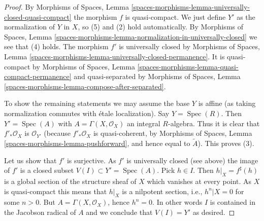\documentclass[10pt,a4paper]{amsart}
\theoremstyle{plain}
\theoremstyle{definition}
\theoremstyle{remark}
\numberwithin{equation}{subsection}
\def\Spec{\mathop{\mathrm{Spec}}}
\begin{document}
\begin{proof}
By Morphisms of Spaces, Lemma
\ref{spaces-morphisms-lemma-universally-closed-quasi-compact}
the morphism $f$ is quasi-compact.
We just define $Y'$ as the normalization of $Y$ in $X$, so (5) and (2) hold
automatically. By
Morphisms of Spaces, Lemma
\ref{spaces-morphisms-lemma-normalization-in-universally-closed}
we see that (4) holds. The morphism $f'$ is universally closed by
Morphisms of Spaces, Lemma
\ref{spaces-morphisms-lemma-universally-closed-permanence}.
It is quasi-compact by
Morphisms of Spaces, Lemma
\ref{spaces-morphisms-lemma-quasi-compact-permanence}
and quasi-separated by
Morphisms of Spaces, Lemma
\ref{spaces-morphisms-lemma-compose-after-separated}.

\medskip\noindent
To show the remaining statements we may assume the base $Y$ is affine
(as taking normalization commutes with \'etale localization).
Say $Y = \Spec(R)$. Then $Y' = \Spec(A)$ with
$A = \Gamma(X, \mathcal{O}_X)$ an integral $R$-algebra.
Thus it is clear that $f'_*\mathcal{O}_X$
is $\mathcal{O}_{Y'}$ (because $f'_*\mathcal{O}_X$ is quasi-coherent,
by Morphisms of Spaces, Lemma
\ref{spaces-morphisms-lemma-pushforward},
and hence equal to $\widetilde{A}$). This proves (3).

\medskip\noindent
Let us show that $f'$ is surjective. As $f'$ is universally closed (see above)
the image of $f'$ is a closed subset
$V(I) \subset Y' = \Spec(A)$. Pick $h \in I$. Then
$h|_X = f^\sharp(h)$ is a global section of the structure sheaf of
$X$ which vanishes at every point. As $X$ is quasi-compact this means
that $h|_X$ is a nilpotent section, i.e., $h^n|X = 0$ for some $n > 0$.
But $A = \Gamma(X, \mathcal{O}_X)$, hence $h^n = 0$.
In other words $I$ is contained in the Jacobson radical of $A$ and we conclude
that $V(I) = Y'$ as desired.
\end{proof}
\end{document}
